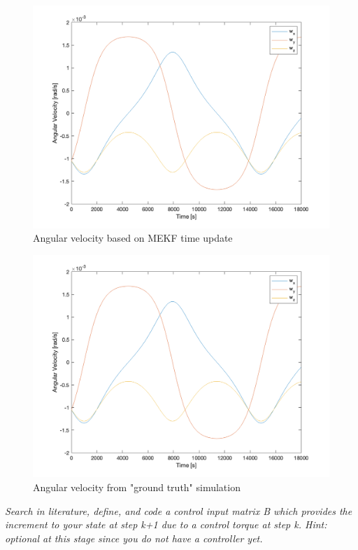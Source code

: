 \begin{figure}[H]
\centering
\includegraphics[scale=0.6]{Images/ps7_problem5a_angvel_est.png}
\caption{Angular velocity based on MEKF time update}
\label{fig:ps7_problem5a_angvel_est}
\end{figure}

\begin{figure}[H]
\centering
\includegraphics[scale=0.6]{Images/ps7_problem5a_angvel_sim.png}
\caption{Angular velocity from "ground truth" simulation}
\label{fig:ps7_problem5a_angvel_sim}
\end{figure}

\textit{Search in literature, define, and code a control input matrix B which provides the increment to your state at step k+1 due to a control torque at step k. Hint: optional at this stage since you do not have a controller yet.}

